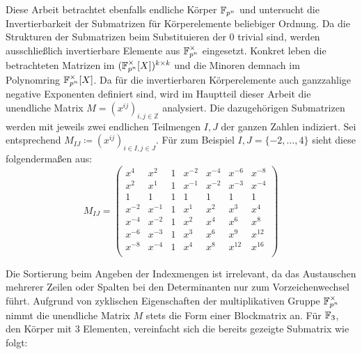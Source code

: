 Diese Arbeit betrachtet ebenfalls endliche Körper $\field{p}[n]$ und untersucht die Invertierbarkeit der Submatrizen für Körperelemente beliebiger Ordnung. Da die Strukturen der Submatrizen beim Substituieren der $0$ trivial sind, werden ausschließlich invertierbare Elemente aus $\field{p}[n]^\times$ eingesetzt. Konkret leben die betrachteten Matrizen im $(\field{p}[n]^\times [X])^{k \times k}$ und die Minoren demnach im Polynomring $\field{p}[n]^\times [X]$. Da für die invertierbaren Körperelemente auch ganzzahlige negative Exponenten definiert sind, wird im Hauptteil dieser Arbeit die unendliche Matrix $M = \left( x^{ij} \right)_{i,j \in \mathbb{Z}}$ analysiert. Die dazugehörigen Submatrizen werden mit jeweils zwei endlichen Teilmengen $I,J$ der ganzen Zahlen indiziert. Sei entsprechend $M_{IJ} \coloneqq \left( x^{ij} \right)_{i \in I,j \in J}$. Für zum Beispiel $I,J = \{-2, \dots, 4\}$ sieht diese folgendermaßen aus:
\begin{equation*}
    M_{IJ} = \begin{pmatrix}
        x^4     & x^{2} & 1    & x^{-2} & x^{-4}& x^{-6}& x^{-8}\\
        x^{2}   & x^{1} & 1    & x^{-1} & x^{-2}& x^{-3}& x^{-4}\\
        1       & 1     & 1    & 1      & 1     & 1     & 1     \\
        x^{-2}  & x^{-1}& 1    & x^{1}  & x^{2} & x^{3} & x^{4} \\
        x^{-4}  & x^{-2}& 1    & x^{2}  & x^{4} & x^{6} & x^{8} \\
        x^{-6}  & x^{-3}& 1    & x^{3}  & x^{6} & x^{9} & x^{12} \\
        x^{-8}  & x^{-4}& 1    & x^{4}  & x^{8} & x^{12} & x^{16} \\
    \end{pmatrix}
\end{equation*}

Die Sortierung beim Angeben der Indexmengen ist irrelevant, da das Austauschen mehrerer Zeilen oder Spalten bei den Determinanten nur zum Vorzeichenwechsel führt. Aufgrund von zyklischen Eigenschaften der multiplikativen Gruppe $\field{p}[n]^\times$ nimmt die unendliche Matrix $M$ stets die Form einer Blockmatrix an. Für $\field{3}$, den Körper mit 3 Elementen, vereinfacht sich die bereits gezeigte Submatrix wie folgt:

